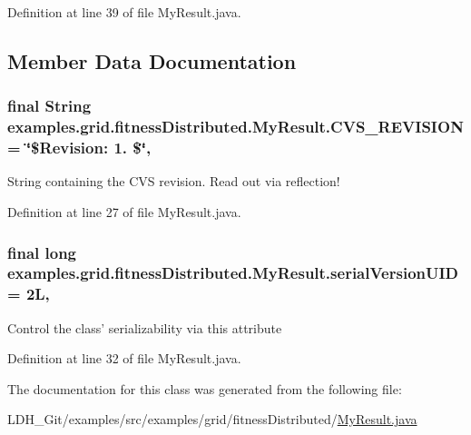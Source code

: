 Definition at line 39 of file My\-Result.\-java.



\subsection{Member Data Documentation}
\hypertarget{classexamples_1_1grid_1_1fitness_distributed_1_1_my_result_ad590af3be34a9a0a8e6800cde882285c}{
\subsubsection[{C\-V\-S\-\_\-\-R\-E\-V\-I\-S\-I\-O\-N}]{\setlength{\rightskip}{0pt plus 5cm}final String examples.\-grid.\-fitness\-Distributed.\-My\-Result.\-C\-V\-S\-\_\-\-R\-E\-V\-I\-S\-I\-O\-N = \char`\"{}\$Revision\-: 1. \$\char`\"{}\hspace{0.3cm}{\ttfamily [static]}, {\ttfamily [private]}}}\label{classexamples_1_1grid_1_1fitness_distributed_1_1_my_result_ad590af3be34a9a0a8e6800cde882285c}
String containing the C\-V\-S revision. Read out via reflection! 

Definition at line 27 of file My\-Result.\-java.

\hypertarget{classexamples_1_1grid_1_1fitness_distributed_1_1_my_result_a4e7d45f91767860912acd33b329abc2f}{
\subsubsection[{serial\-Version\-U\-I\-D}]{\setlength{\rightskip}{0pt plus 5cm}final long examples.\-grid.\-fitness\-Distributed.\-My\-Result.\-serial\-Version\-U\-I\-D = 2\-L\hspace{0.3cm}{\ttfamily [static]}, {\ttfamily [private]}}}\label{classexamples_1_1grid_1_1fitness_distributed_1_1_my_result_a4e7d45f91767860912acd33b329abc2f}
Control the class' serializability via this attribute 

Definition at line 32 of file My\-Result.\-java.



The documentation for this class was generated from the following file\-:\begin{DoxyCompactItemize}
\item 
L\-D\-H\-\_\-\-Git/examples/src/examples/grid/fitness\-Distributed/\hyperlink{_my_result_8java}{My\-Result.\-java}\end{DoxyCompactItemize}
